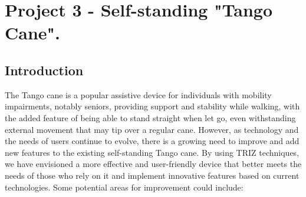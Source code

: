\documentclass[12pt, twoside]{report}
\begin{document}
\chapter{Project 3 - \LARGE Self-standing "Tango Cane".}
\section{Introduction}
The Tango cane is a popular assistive device for individuals with mobility impairments, notably seniors, providing support and stability while walking, with the added feature of being able to stand straight when let go, even withstanding external movement that may tip over a regular cane. However, as technology and the needs of users continue to evolve, there is a growing need to improve and add new features to the existing self-standing Tango cane. By using TRIZ techniques, we have envisioned a more effective and user-friendly device that better meets the needs of those who rely on it and implement innovative features based on current technologies. Some potential areas for improvement could include:
\end{document}
